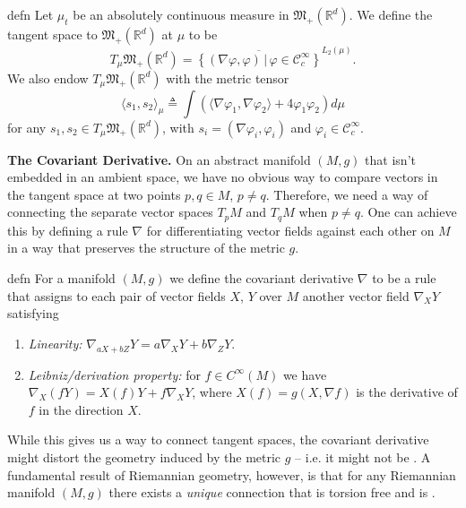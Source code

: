 \documentclass[11pt]{article}
\newcommand{\man}{M}
\newcommand{\posm}{\mathfrak{M}_+(\mathbb{R}^d)}
\begin{document}
\begin{restatable}{defn}{}
    Let $\mu_t$ be an absolutely continuous measure in $\mathfrak{M}_+(\mathbb{R}^d).$ We define the tangent space to $\posm$ at $\mu$ to be 
    \begin{equation}
        T_\mu \posm = \overline{\left\{(\nabla \varphi, \varphi) \, | \, \varphi \in \mathcal{C}_c^{\infty}\right\}}^{L_2(\mu)}.
    \end{equation}
    We also endow $T_\mu \posm$ with the metric tensor
    \begin{equation}
        \langle s_1,  s_2\rangle_{\mu} \triangleq \int \left(\langle\nabla\varphi_1, \nabla\varphi_2\rangle + 4\varphi_1\varphi_2 \right) d\mu
    \end{equation}
    for any $s_1, s_2\in T_\mu \posm$, with $s_i = (\nabla \varphi_i, \varphi_i)$ and $\varphi_i \in \mathcal{C}_c^\infty$. 
\end{restatable}

\noindent \textbf{The Covariant Derivative.} 
On an abstract manifold $(\man, g)$ that isn't embedded in an ambient space, we have no obvious way to compare vectors in the tangent space at two points $p, q \in \man$, $p \neq q$. Therefore, we need a way of connecting the separate vector spaces $T_p\man$ and $T_q\man$ when $p \neq q$. One can achieve this by defining a rule $\nabla$ for differentiating vector fields against each other on $\man$ in a way that preserves the structure of the metric $g$.

\begin{restatable}{defn}{}
    For a manifold $(\man, g)$ we define the covariant derivative $\nabla$ to be a rule that assigns to each pair of vector fields $X$, $Y$ over $\man$ another vector field $\nabla_XY$ satisfying 
    \begin{enumerate}
        \item \textit{Linearity:} $\nabla_{aX+bZ}Y = a\nabla_XY + b\nabla_ZY.$
        \item \textit{Leibniz/derivation property:} for $f \in C^{\infty}(\man)$ we have $\nabla_X(fY) = X(f)Y + f\nabla_XY$, where $X(f) = g(X, \nabla f)$ is the derivative of $f$ in the direction $X$.
    \end{enumerate}
\end{restatable}

While this gives us a way to connect tangent spaces, the covariant derivative might distort the geometry induced by the metric $g$ -- i.e. it might not be . A fundamental result of Riemannian geometry, however, is that for any Riemannian manifold $(\man, g)$ there exists a \textit{unique} connection that is torsion free and is . 
\end{document}
